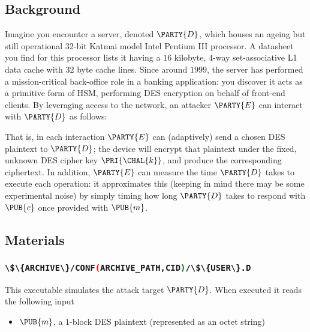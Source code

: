\documentclass[crop={false},multi={true},tikz={true}]{standalone}
\begin{document}

\subsection{Background}

Imagine you encounter a server, denoted $\PARTY{D}$, 
which houses an ageing but still operational $32$-bit Katmai model Intel 
Pentium III processor.  
A datasheet you find for this processor lists it having a $16$ kilobyte, 
$4$-way set-associative L1 data cache with $32$ byte cache lines.  Since
around $1999$, the server has performed a mission-critical back-office 
role in a banking application: you discover it acts as a primitive form 
of HSM, performing DES encryption on behalf of front-end clients.
By leveraging access to the network, 
an attacker $\PARTY{E}$ can interact with $\PARTY{D}$ as follows:

\begin{center}

\end{center}

\noindent
That is, in each interaction $\PARTY{E}$ can (adaptively) send 
a chosen DES  plaintext
to $\PARTY{D}$; the device will
encrypt that  plaintext under the fixed, unknown DES cipher key $\PRI{\CHAL{k}}$,
and produce 
the corresponding ciphertext.
In addition, $\PARTY{E}$ can measure the time $\PARTY{D}$ takes to execute 
each operation: it approximates this 
(keeping in mind there may be some experimental noise) 
by simply timing how long $\PARTY{D}$ takes to respond with $\PUB{c}$ once 
provided with $\PUB{m}$.

\subsection{Materials}

\subsubsection{\lstinline[language={bash}]|\$\{ARCHIVE\}/CONF(ARCHIVE_PATH,CID)/\$\{USER\}.D|}

This executable simulates the attack target $\PARTY{D}$.  When executed it 
reads the following input

\begin{itemize}
\item $\PUB{m}$, 
      a  ${1}$-block DES plaintext 
      (represented as an           octet string)
\end{itemize}
\end{document}
